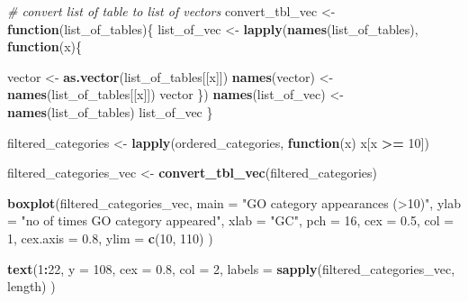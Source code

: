 \documentclass[]{article}
\newenvironment{Shaded}{\begin{snugshade}}{\end{snugshade}}
\newcommand{\KeywordTok}[1]{\textcolor[rgb]{0.13,0.29,0.53}{\textbf{#1}}}
\newcommand{\DataTypeTok}[1]{\textcolor[rgb]{0.13,0.29,0.53}{#1}}
\newcommand{\DecValTok}[1]{\textcolor[rgb]{0.00,0.00,0.81}{#1}}
\newcommand{\FloatTok}[1]{\textcolor[rgb]{0.00,0.00,0.81}{#1}}
\newcommand{\StringTok}[1]{\textcolor[rgb]{0.31,0.60,0.02}{#1}}
\newcommand{\CommentTok}[1]{\textcolor[rgb]{0.56,0.35,0.01}{\textit{#1}}}
\newcommand{\ControlFlowTok}[1]{\textcolor[rgb]{0.13,0.29,0.53}{\textbf{#1}}}
\newcommand{\OperatorTok}[1]{\textcolor[rgb]{0.81,0.36,0.00}{\textbf{#1}}}
\newcommand{\NormalTok}[1]{#1}
\begin{document}
\begin{Shaded}
\begin{Highlighting}[]
\CommentTok{# convert list of table to list of vectors}
\NormalTok{convert_tbl_vec <-}\StringTok{ }\ControlFlowTok{function}\NormalTok{(list_of_tables)\{}
\NormalTok{  list_of_vec <-}\StringTok{ }\KeywordTok{lapply}\NormalTok{(}\KeywordTok{names}\NormalTok{(list_of_tables), }\ControlFlowTok{function}\NormalTok{(x)\{}
  
\NormalTok{    vector <-}\StringTok{ }\KeywordTok{as.vector}\NormalTok{(list_of_tables[[x]])}
    \KeywordTok{names}\NormalTok{(vector) <-}\StringTok{ }\KeywordTok{names}\NormalTok{(list_of_tables[[x]])}
\NormalTok{    vector}
\NormalTok{  \})}
  \KeywordTok{names}\NormalTok{(list_of_vec) <-}\StringTok{ }\KeywordTok{names}\NormalTok{(list_of_tables)}
\NormalTok{  list_of_vec}
\NormalTok{\}}
\end{Highlighting}
\end{Shaded}

\begin{Shaded}
\begin{Highlighting}[]
\NormalTok{filtered_categories <-}\StringTok{ }\KeywordTok{lapply}\NormalTok{(ordered_categories, }\ControlFlowTok{function}\NormalTok{(x) x[x }\OperatorTok{>=}\StringTok{ }\DecValTok{10}\NormalTok{])}

\NormalTok{filtered_categories_vec <-}\StringTok{ }\KeywordTok{convert_tbl_vec}\NormalTok{(filtered_categories) }

\KeywordTok{boxplot}\NormalTok{(filtered_categories_vec,}
        \DataTypeTok{main =} \StringTok{"GO category appearances (>10)"}\NormalTok{,}
        \DataTypeTok{ylab =} \StringTok{"no of times GO category appeared"}\NormalTok{,}
        \DataTypeTok{xlab =} \StringTok{"GC"}\NormalTok{,}
        \DataTypeTok{pch  =} \DecValTok{16}\NormalTok{,}
        \DataTypeTok{cex  =} \FloatTok{0.5}\NormalTok{,}
        \DataTypeTok{col  =} \DecValTok{1}\NormalTok{,}
        \DataTypeTok{cex.axis =} \FloatTok{0.8}\NormalTok{,}
        \DataTypeTok{ylim =} \KeywordTok{c}\NormalTok{(}\DecValTok{10}\NormalTok{, }\DecValTok{110}\NormalTok{)}
\NormalTok{        )}

\KeywordTok{text}\NormalTok{(}\DecValTok{1}\OperatorTok{:}\DecValTok{22}\NormalTok{, }
     \DataTypeTok{y   =} \DecValTok{108}\NormalTok{, }
     \DataTypeTok{cex =} \FloatTok{0.8}\NormalTok{, }
     \DataTypeTok{col =} \DecValTok{2}\NormalTok{,}
     \DataTypeTok{labels =} \KeywordTok{sapply}\NormalTok{(filtered_categories_vec, length)}
\NormalTok{     )}
\end{Highlighting}
\end{Shaded}
\end{document}
